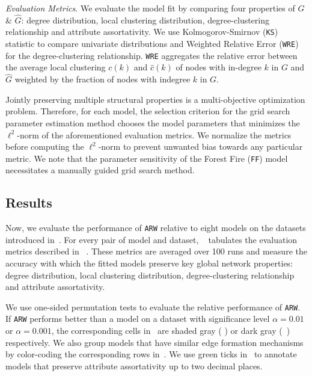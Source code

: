 \textit{Evaluation Metrics}.
We evaluate the model fit by comparing four properties of ${G}$ \& $\hat{G}$:
degree distribution, local clustering distribution, degree-clustering relationship
and attribute assortativity. We use Kolmogorov-Smirnov (\texttt{KS}) statistic to compare univariate
distributions and Weighted Relative Error (\texttt{WRE}) for the degree-clustering relationship.
\texttt{WRE} aggregates the relative error between the average local clustering $c(k)$ and $\hat{c}(k)$ of nodes with in-degree $k$ in $G$ and $\hat{G}$ weighted by the fraction of nodes with indegree $k$ in $G$.

Jointly preserving multiple structural properties is a multi-objective optimization
problem.
Therefore, for each model, the selection criterion for the grid search parameter estimation method
chooses the model parameters that minimizes the $\ell^2$-norm of the aforementioned evaluation metrics.
We normalize the metrics before computing the $\ell^2$-norm
to prevent unwanted bias towards any particular metric.
We note that the parameter sensitivity of the Forest Fire (\texttt{FF}) model necessitates
a manually guided grid search method.

\subsection{Results}
\label{sub:Experimental Results}

Now, we evaluate the performance of \texttt{ARW} relative to eight
models on the datasets introduced in~.
For every pair of model and dataset, ~ tabulates the evaluation metrics
described in ~.
These metrics are averaged over 100 runs and measure the accuracy with which the fitted models
preserve key global network properties: degree distribution, local clustering distribution,
degree-clustering relationship and attribute assortativity.


We use one-sided permutation tests \cite{good2013permutation} to evaluate the relative
performance of \texttt{ARW}. If \texttt{ARW} performs better than a model on a dataset
with significance level $\alpha=0.01$ or $\alpha=0.001$, the corresponding cells in~
are shaded gray ( \lightgraybg{ }) or dark gray (~\darkgraybg{ }) respectively.
We also group models that have similar edge formation mechanisms by color-coding the
corresponding rows in~.  We use green ticks in~ to
annotate models that preserve attribute assortativity up to two decimal places.

